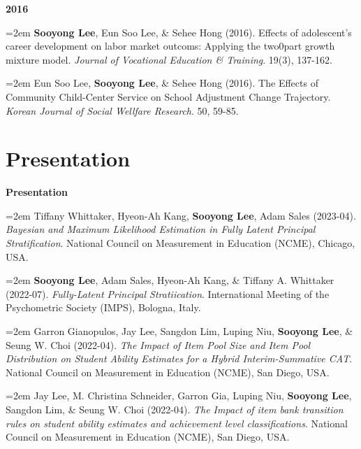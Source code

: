 \documentclass[11pt,letterpaper,]{awesome-me}
\begin{document}
\setlength{\leftskip}{0cm}

\textbf{2016}

\setlength{\leftskip}{0.5cm}

\hangindent=2em  \textbf{Sooyong Lee}, Eun Soo Lee, \& Sehee
Hong (2016). Effects of adolescent's career development on labor market
outcoms: Applying the two0part growth mixture model. \emph{Journal of
Vocational Education \& Training}. 19(3), 137-162.

\hangindent=2em  Eun Soo Lee, \textbf{Sooyong Lee}, \& Sehee
Hong (2016). The Effects of Community Child-Center Service on School
Adjustment Change Trajectory. \emph{Korean Journal of Social Wellfare
Research}. 50, 59-85.

\setlength{\leftskip}{0cm}

\hypertarget{presentation}{%
\section{Presentation}\label{presentation}}

\setlength{\leftskip}{0cm}

\textbf{Presentation}

\setlength{\leftskip}{0.5cm}

\hangindent=2em  Tiffany Whittaker, Hyeon-Ah Kang,
\textbf{Sooyong Lee}, Adam Sales (2023-04). \emph{Bayesian and Maximum
Likelihood Estimation in Fully Latent Principal Stratification}.
National Council on Measurement in Education (NCME), Chicago, USA.

\hangindent=2em  \textbf{Sooyong Lee}, Adam Sales, Hyeon-Ah
Kang, \& Tiffany A. Whittaker (2022-07). \emph{Fully-Latent Principal
Stratiication}. International Meeting of the Psychometric Society
(IMPS), Bologna, Italy.

\hangindent=2em  Garron Gianopulos, Jay Lee, Sangdon Lim,
Luping Niu, \textbf{Sooyong Lee}, \& Seung W. Choi (2022-04). \emph{The
Impact of Item Pool Size and Item Pool Distribution on Student Ability
Estimates for a Hybrid Interim-Summative CAT}. National Council on
Measurement in Education (NCME), San Diego, USA.

\hangindent=2em  Jay Lee, M. Christina Schneider, Garron
Gia, Luping Niu, \textbf{Sooyong Lee}, Sangdon Lim, \& Seung W. Choi
(2022-04). \emph{The Impact of item bank transition rules on student
ability estimates and achievement level classifications}. National
Council on Measurement in Education (NCME), San Diego, USA.
\end{document}
